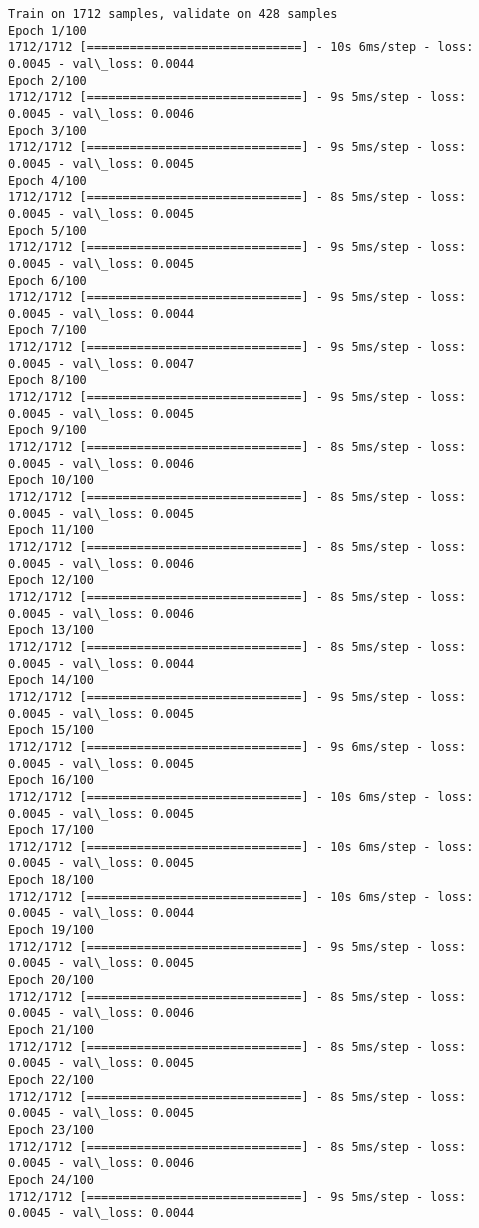 \documentclass[11pt]{article}
\begin{document}
    \begin{Verbatim}[commandchars=\\\{\}]
Train on 1712 samples, validate on 428 samples
Epoch 1/100
1712/1712 [==============================] - 10s 6ms/step - loss: 0.0045 - val\_loss: 0.0044
Epoch 2/100
1712/1712 [==============================] - 9s 5ms/step - loss: 0.0045 - val\_loss: 0.0046
Epoch 3/100
1712/1712 [==============================] - 9s 5ms/step - loss: 0.0045 - val\_loss: 0.0045
Epoch 4/100
1712/1712 [==============================] - 8s 5ms/step - loss: 0.0045 - val\_loss: 0.0045
Epoch 5/100
1712/1712 [==============================] - 9s 5ms/step - loss: 0.0045 - val\_loss: 0.0045
Epoch 6/100
1712/1712 [==============================] - 9s 5ms/step - loss: 0.0045 - val\_loss: 0.0044
Epoch 7/100
1712/1712 [==============================] - 9s 5ms/step - loss: 0.0045 - val\_loss: 0.0047
Epoch 8/100
1712/1712 [==============================] - 9s 5ms/step - loss: 0.0045 - val\_loss: 0.0045
Epoch 9/100
1712/1712 [==============================] - 8s 5ms/step - loss: 0.0045 - val\_loss: 0.0046
Epoch 10/100
1712/1712 [==============================] - 8s 5ms/step - loss: 0.0045 - val\_loss: 0.0045
Epoch 11/100
1712/1712 [==============================] - 8s 5ms/step - loss: 0.0045 - val\_loss: 0.0046
Epoch 12/100
1712/1712 [==============================] - 8s 5ms/step - loss: 0.0045 - val\_loss: 0.0046
Epoch 13/100
1712/1712 [==============================] - 8s 5ms/step - loss: 0.0045 - val\_loss: 0.0044
Epoch 14/100
1712/1712 [==============================] - 9s 5ms/step - loss: 0.0045 - val\_loss: 0.0045
Epoch 15/100
1712/1712 [==============================] - 9s 6ms/step - loss: 0.0045 - val\_loss: 0.0045
Epoch 16/100
1712/1712 [==============================] - 10s 6ms/step - loss: 0.0045 - val\_loss: 0.0045
Epoch 17/100
1712/1712 [==============================] - 10s 6ms/step - loss: 0.0045 - val\_loss: 0.0045
Epoch 18/100
1712/1712 [==============================] - 10s 6ms/step - loss: 0.0045 - val\_loss: 0.0044
Epoch 19/100
1712/1712 [==============================] - 9s 5ms/step - loss: 0.0045 - val\_loss: 0.0045
Epoch 20/100
1712/1712 [==============================] - 8s 5ms/step - loss: 0.0045 - val\_loss: 0.0046
Epoch 21/100
1712/1712 [==============================] - 8s 5ms/step - loss: 0.0045 - val\_loss: 0.0045
Epoch 22/100
1712/1712 [==============================] - 8s 5ms/step - loss: 0.0045 - val\_loss: 0.0045
Epoch 23/100
1712/1712 [==============================] - 8s 5ms/step - loss: 0.0045 - val\_loss: 0.0046
Epoch 24/100
1712/1712 [==============================] - 9s 5ms/step - loss: 0.0045 - val\_loss: 0.0044

\end{Verbatim}
\end{document}
